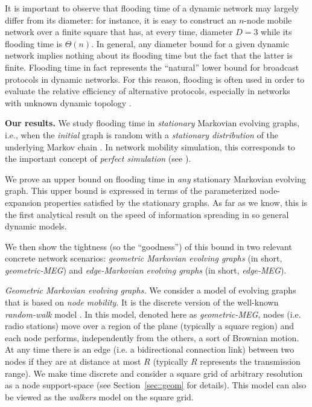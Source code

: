 \documentclass[10pt,a4paper]{article}
\begin{document}
\noindent It is important to observe that flooding time of a  dynamic network  may largely differ from its diameter: for instance, it is easy to construct  an $n$-node mobile  network over a finite square that has, at every time, diameter $D =3$ while its flooding time is $\Theta(n)$. In general, any diameter bound for a given dynamic network implies nothing about its flooding time but the fact that the latter is finite. Flooding time in fact represents the ``natural'' lower bound for broadcast protocols in dynamic networks. For this reason, flooding is often used in order to evaluate the relative efficiency of alternative protocols, especially in networks with unknown dynamic topology \cite{CL05,GS05,OS07}.

\medskip \noindent \textbf{Our results.}
We study flooding time in \emph{stationary} Markovian evolving graphs, i.e., when the \emph{initial} graph is random with a \emph{stationary distribution} of the underlying Markov chain \cite{AF99}. In network mobility simulation, this corresponds to the important concept of \emph{perfect simulation} (see \cite{LV05,CNB04}).

We prove an upper bound on flooding time in \emph{any} stationary Markovian evolving graph. This upper bound is expressed in terms of the parameterized node-expansion properties satisfied by the stationary graphs. As far as we know, this is the first analytical result on the speed of information spreading in so general dynamic models.

\noindent We then show the tightness (so the ``goodness'') of this bound in two relevant concrete network scenarios: \emph{geometric Markovian evolving graphs} (in short, \emph{geometric-MEG}) and \emph{edge-Markovian evolving graphs} (in short, \emph{edge-MEG}).

\smallskip \noindent \emph{Geometric Markovian evolving graphs.}
We consider a model of evolving graphs that is based on \emph{node mobility}. It is the discrete version of the well-known \emph{random-walk} model \cite{G87,CBD02,DMP08,JMR09}. In this model, denoted here as \emph{geometric-MEG}, nodes (i.e. radio stations) move over a region of the plane (typically a square region) and each node performs, independently from the others, a sort of Brownian motion. At any time there is an edge (i.e. a bidirectional connection link) between two nodes if they are at distance at most $R$ (typically $R$ represents the transmission range). We make time discrete and consider a square grid of arbitrary resolution as a node support-space (see Section~\ref{sec::geom} for details). This model can also be viewed as the \emph{walkers} model \cite{DMP08} on the square grid.
\end{document}
